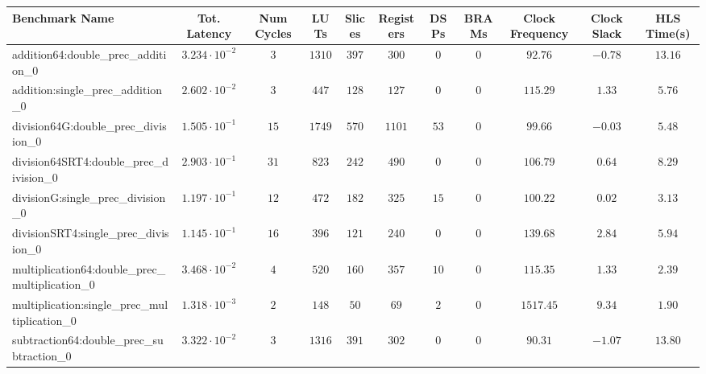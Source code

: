 \begin{tabular}{|l|c|c|c|c|c|c|c|c|c|c|}
\hline
Benchmark Name                                   & Tot. Latency            & Num Cycles & LUTs     & Slices   & Registers & DSPs   & BRAMs & Clock Frequency & Clock Slack & HLS Time(s) \\
\hline
addition64:double\_prec\_addition\_0             & $ 3.234 \cdot 10^{-2} $ & $ 3      $ & $ 1310 $ & $ 397  $ & $ 300   $ & $ 0  $ & $ 0 $ & $ 92.76       $ & $ -0.78   $ & $ 13.16   $ \\
addition:single\_prec\_addition\_0               & $ 2.602 \cdot 10^{-2} $ & $ 3      $ & $ 447  $ & $ 128  $ & $ 127   $ & $ 0  $ & $ 0 $ & $ 115.29      $ & $ 1.33    $ & $ 5.76    $ \\
division64G:double\_prec\_division\_0            & $ 1.505 \cdot 10^{-1} $ & $ 15     $ & $ 1749 $ & $ 570  $ & $ 1101  $ & $ 53 $ & $ 0 $ & $ 99.66       $ & $ -0.03   $ & $ 5.48    $ \\
division64SRT4:double\_prec\_division\_0         & $ 2.903 \cdot 10^{-1} $ & $ 31     $ & $ 823  $ & $ 242  $ & $ 490   $ & $ 0  $ & $ 0 $ & $ 106.79      $ & $ 0.64    $ & $ 8.29    $ \\
divisionG:single\_prec\_division\_0              & $ 1.197 \cdot 10^{-1} $ & $ 12     $ & $ 472  $ & $ 182  $ & $ 325   $ & $ 15 $ & $ 0 $ & $ 100.22      $ & $ 0.02    $ & $ 3.13    $ \\
divisionSRT4:single\_prec\_division\_0           & $ 1.145 \cdot 10^{-1} $ & $ 16     $ & $ 396  $ & $ 121  $ & $ 240   $ & $ 0  $ & $ 0 $ & $ 139.68      $ & $ 2.84    $ & $ 5.94    $ \\
multiplication64:double\_prec\_multiplication\_0 & $ 3.468 \cdot 10^{-2} $ & $ 4      $ & $ 520  $ & $ 160  $ & $ 357   $ & $ 10 $ & $ 0 $ & $ 115.35      $ & $ 1.33    $ & $ 2.39    $ \\
multiplication:single\_prec\_multiplication\_0   & $ 1.318 \cdot 10^{-3} $ & $ 2      $ & $ 148  $ & $ 50   $ & $ 69    $ & $ 2  $ & $ 0 $ & $ 1517.45     $ & $ 9.34    $ & $ 1.90    $ \\
subtraction64:double\_prec\_subtraction\_0       & $ 3.322 \cdot 10^{-2} $ & $ 3      $ & $ 1316 $ & $ 391  $ & $ 302   $ & $ 0  $ & $ 0 $ & $ 90.31       $ & $ -1.07   $ & $ 13.80   $ \\

\end{tabular}
